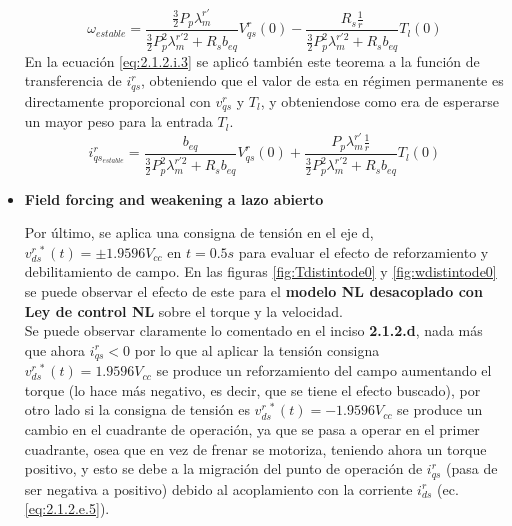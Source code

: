 \documentclass[10pt]{article}
\begin{document}
\begin{itemize}
	\begin{equation}
	\omega_{estable}=\frac{\frac{3}{2}P_{p}\lambda^{r'}_{m}}{\frac{3}{2}P^{2}_{p}\lambda^{r'2}_{m}+ R_{s}b_{eq}}V^{r}_{qs}(0) -  \frac{R_{s} \frac{1}{r}}{\frac{3}{2}P^{2}_{p}\lambda^{r'2}_{m}+ R_{s}b_{eq}}T_{l}(0)
	\label{eq:2.1.2.i.2}
	\end{equation}
	 En la ecuación \ref{eq:2.1.2.i.3} se aplicó también este teorema a la función de transferencia de $i^{r}_{qs}$, obteniendo que el valor de esta en régimen permanente es directamente proporcional con $v^{r}_{qs}$ y $T_{l}$, y obteniendose como era de esperarse un mayor peso para la entrada $T_{l}$.
	 	\begin{equation}
	i^{r}_{qs_{estable}}=\frac{b_{eq}}{\frac{3}{2}P^{2}_{p}\lambda^{r'2}_{m}+ R_{s}b_{eq}}V^{r}_{qs}(0) +  \frac{P_{p}\lambda^{r'}_{m} \frac{1}{r}}{\frac{3}{2}P^{2}_{p}\lambda^{r'2}_{m}+ R_{s}b_{eq}}T_{l}(0)
	\label{eq:2.1.2.i.3}
	\end{equation}
	
	\item \textbf{Field forcing and weakening a lazo abierto }
	
	Por último, se aplica una consigna de tensión en el eje d, $v^{r \ *}_{ds}(t)=\pm 1.9596 V_{cc}$ en $t=0.5 s$ para evaluar el efecto de reforzamiento y debilitamiento de campo. En las figuras \ref{fig:Tdistintode0} y \ref{fig:wdistintode0} se puede observar el efecto de este para el \textbf{modelo NL desacoplado con Ley de control NL} sobre el torque y la velocidad.\\
	Se puede observar claramente lo comentado en el inciso \textbf{2.1.2.d}, nada más que ahora $i^{r}_{qs}<0$ por lo que al aplicar la tensión consigna $v^{r \ *}_{ds}(t)= 1.9596 V_{cc}$ se produce un reforzamiento del campo aumentando el torque (lo hace más negativo, es decir, que se tiene el efecto buscado), por otro lado si la consigna de tensión es  $v^{r \ *}_{ds}(t)= -1.9596 V_{cc}$ se produce un cambio en el cuadrante de operación, ya que se pasa a operar en el primer cuadrante, osea que en vez de frenar se motoriza, teniendo ahora un torque positivo, y esto se debe a la migración del punto de operación de $i^{r}_{qs}$ (pasa de ser negativa a positivo) debido al acoplamiento con la corriente $i^{r}_{ds}$ (ec. \ref{eq:2.1.2.e.5}).
	

\end{itemize}
\end{document}
